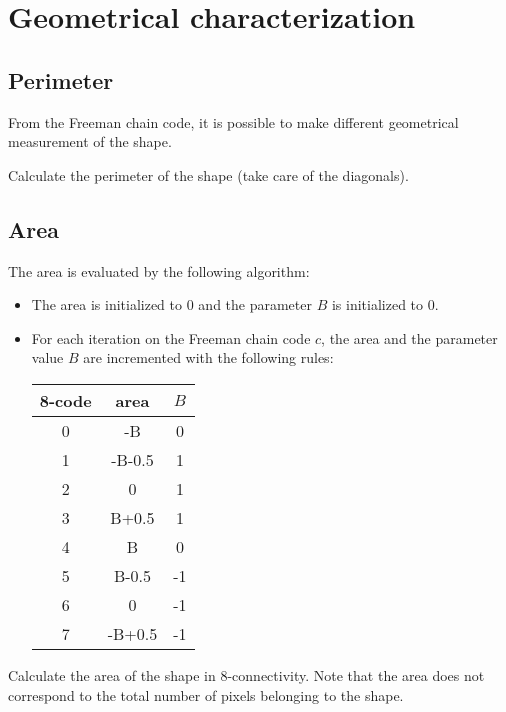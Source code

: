 \section{Geometrical characterization}
\subsection{Perimeter}
From the Freeman chain code, it is possible to make different geometrical measurement of the shape.
\begin{qbox}Calculate the perimeter of the shape (take care of the diagonals).
	
	
	\end{qbox}
	
\subsection{Area}
The area is evaluated by the following algorithm:
\begin{itemize}
	\item The area is initialized to  $0$ and the parameter $B$ is initialized to $0$.
	\item For each iteration on the Freeman chain code $c$, the area and the para\-me\-ter va\-lue $B$ are incremented with the following rules:
	
	\begin{center}
	\begin{tabular}{|c|c|c|}
	\hline
		8-code & area & $B$\\\hline
		0&-B&0\\
		1&-B-0.5&1\\
		2&0&1\\
		3&B+0.5&1\\
		4&B&0\\
		5&B-0.5&-1\\
		6&0&-1\\
		7&-B+0.5&-1\\\hline
	\end{tabular}
	\end{center}
\end{itemize}
\begin{qbox}
Calculate the area of the shape in 8-con\-nec\-ti\-vity. Note that the area does not correspond to the total number of pixels belonging to the shape.
\end{qbox}

